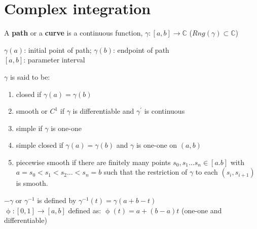 \chapter{Complex integration}
\begin{defn}
A \textbf{path} or a \textbf{curve} is a continuous function, $\gamma:[a,b]\rightarrow \mathds{C}$ 
($Rng(\gamma)\subset \mathds{C}$) 
\end{defn}
$\gamma(a)$: initial point of path; $\gamma(b)$: endpoint of path\\
$[a,b]$: parameter interval 
\begin{defn}
$\gamma$ is said to be:
\begin{enumerate}
    \item closed if $\gamma(a)=\gamma(b)$
    \item smooth or $C^1$ if $\gamma$ is differentiable and $\gamma^{'}$ is continuous
    \item simple if $\gamma$ is one-one
    \item simple closed if $\gamma(a)=\gamma(b)$ and $\gamma$ is one-one on $(a,b)$
    \item piecewise smooth if there are finitely many points $s_0,s_1 \dots s_n\in [a.b]$ with $a=s_0<s_1<s_2 \dots <s_n=b$ such that the restriction of $\gamma$ to each $(s_i,s_{i+1})$ is smooth.
\end{enumerate}
\end{defn}
$-\gamma$ or $\gamma^{-1}$ is defined by $\gamma^{-1}(t)=\gamma(a+b-t)$\\
$\upphi:[0,1]\rightarrow [a,b]$ defined as: $\upphi(t)=a+(b-a)t$ (one-one and differentiable)
